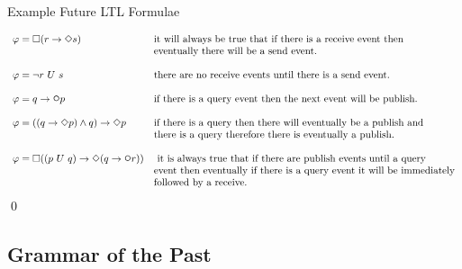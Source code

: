 \begin{myEx} Example Future LTL Formulae

$$\begin{array}{ll}
\varphi = \LTLalways(r \rightarrow \LTLeventually s)& \mbox{it will always be true that if there is a receive event then}\\
& \mbox{eventually there will be a send event.}
\\
\\
\varphi = \neg r\ U\ s& \mbox{there are no receive events until there is a send event.}
\\
\\
\varphi = q \rightarrow \LTLnext p& \mbox{if there is a query event then the next event will be publish.}
\\
\\
\varphi = ((q \rightarrow \LTLeventually p) \land q) \rightarrow \LTLeventually p& \mbox{if there is a query then there will eventually be a publish and}\\
& \mbox{there is a query therefore there is eventually a publish.}
\\
\\
\varphi = \LTLalways((p \ U\ q) \rightarrow \LTLeventually(q \rightarrow \LTLnext r))& \mbox{ it is always true that if there are publish events until a query}\\ & \mbox{event then eventually if there is a query event it will be immediately}\\ & \mbox{followed by a receive.}
\end{array}$$
\qed
\end{myEx}

\subsection{Grammar of the Past}
\label{sec:LTLPastGrammar}

